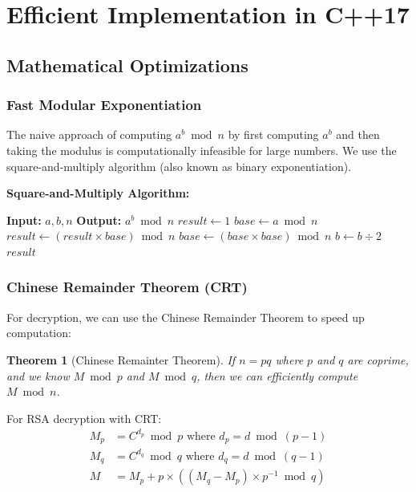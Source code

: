 \documentclass[11pt,a4paper]{article}
\newtheorem{theorem}{Theorem}[section]
\begin{document}
\section{Efficient Implementation in C++17}

\subsection{Mathematical Optimizations}

\subsubsection{Fast Modular Exponentiation}

The naive approach of computing $a^b \bmod n$ by first computing $a^b$ and then taking the modulus is computationally infeasible for large numbers. We use the square-and-multiply algorithm (also known as binary exponentiation).

\begin{mathbox}
\textbf{Square-and-Multiply Algorithm:}
\begin{algorithmic}
\STATE \textbf{Input:} $a, b, n$
\STATE \textbf{Output:} $a^b \bmod n$
\STATE $result \leftarrow 1$
\STATE $base \leftarrow a \bmod n$
        \STATE $result \leftarrow (result \times base) \bmod n$
    \ENDIF
    \STATE $base \leftarrow (base \times base) \bmod n$
    \STATE $b \leftarrow b \div 2$
\ENDWHILE
\RETURN $result$
\end{algorithmic}
\end{mathbox}

\subsubsection{Chinese Remainder Theorem (CRT)}

For decryption, we can use the Chinese Remainder Theorem to speed up computation:

\begin{theorem}[Chinese Remainter Theorem]
If $n = pq$ where $p$ and $q$ are coprime, and we know $M \bmod p$ and $M \bmod q$, then we can efficiently compute $M \bmod n$.
\end{theorem}

For RSA decryption with CRT:
\begin{align*}
M_p &= C^{d_p} \bmod p \text{ where } d_p = d \bmod (p-1) \\
M_q &= C^{d_q} \bmod q \text{ where } d_q = d \bmod (q-1) \\
M &= M_p + p \times ((M_q - M_p) \times p^{-1} \bmod q)
\end{align*}
\end{document}
